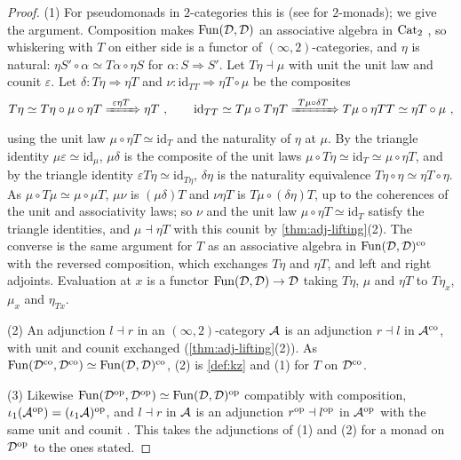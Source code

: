 \begin{proof}
%
(1) For pseudomonads in $2$-categories this is
\cite[Thm.~11.1]{marmolejo1997doctrines} (see
\cite[Thm.~6.2]{kellylack1997propertylike} for $2$-monads); we give the
argument. Composition makes $\operatorname{Fun}(\mathcal{D},\mathcal{D})$ an associative algebra in $\mathrm{Cat}_{2}$
\cite[\S 4.7.1]{ha}, so whiskering with $T$ on either side is a functor of
$(\infty,2)$-categories, and $\eta$ is natural:
$\eta S' \circ \alpha \simeq T\alpha \circ \eta S$
for
$\alpha\colon S \Rightarrow S'$.
Let
$T\eta \dashv \mu$
with unit the unit law and counit $\varepsilon$. Let
$\delta\colon T\eta \Rightarrow \eta T$
and
$\nu\colon \mathrm{id}_{TT} \Rightarrow \eta T \circ \mu$
be the composites
\begin{equation*}
T\eta \simeq T\eta \circ \mu \circ \eta T \xRightarrow{\ \varepsilon\eta T\ }
\eta T \ , \qquad \mathrm{id}_{TT} \simeq T\mu \circ T\eta T
\xRightarrow{\ T\mu \circ \delta T\ } T\mu \circ \eta TT \simeq \eta T \circ
\mu \ ,
\end{equation*}
using the unit law
$\mu \circ \eta T \simeq \mathrm{id}_{T}$
and the naturality of $\eta$ at $\mu$.
By the triangle identity
$\mu\varepsilon \simeq \mathrm{id}_{\mu}$,
$\mu\delta$ is the composite of the unit laws
$\mu \circ T\eta \simeq \mathrm{id}_{T} \simeq \mu \circ \eta T$,
and by the triangle identity
$\varepsilon T\eta \simeq \mathrm{id}_{T\eta}$,
$\delta\eta$ is the naturality equivalence
$T\eta \circ \eta \simeq \eta T \circ \eta$.
As
$\mu \circ T\mu \simeq \mu \circ \mu T$,
$\mu\nu$ is $(\mu\delta)T$ and
$\nu\eta T$ is
$T\mu \circ (\delta\eta)T$,
up to the coherences of the unit and associativity laws; so $\nu$ and the unit
law
$\mu \circ \eta T \simeq \mathrm{id}_{T}$
satisfy the triangle identities, and
$\mu \dashv \eta T$
with this counit by \cref{thm:adj-lifting}(2). The converse is the same
argument for $T$ as an associative algebra in
$\operatorname{Fun}(\mathcal{D},\mathcal{D})^{\mathrm{co}}$
with
the reversed composition, which exchanges $T\eta$ and $\eta T$, and left and
right adjoints.
Evaluation at $x$ is a functor
$\operatorname{Fun}(\mathcal{D},\mathcal{D}) \to \mathcal{D}$
taking $T\eta$, $\mu$ and $\eta T$ to $T\eta_{x}$, $\mu_{x}$ and $\eta_{Tx}$.

(2) An adjunction $l \dashv r$ in an $(\infty,2)$-category $\mathcal{A}$ is an adjunction
$r \dashv l$ in $\mathcal{A}^{\mathrm{co}}$, with unit and counit exchanged
(\cref{thm:adj-lifting}(2)). As
$\operatorname{Fun}(\mathcal{D}^{\mathrm{co}},\mathcal{D}^{\mathrm{co}}) \simeq \operatorname{Fun}(\mathcal{D},\mathcal{D})^{\mathrm{co}}$,
(2) is \cref{def:kz} and (1) for $T$ on $\mathcal{D}^{\mathrm{co}}$.

(3) Likewise
$\operatorname{Fun}(\mathcal{D}^{\mathrm{op}},\mathcal{D}^{\mathrm{op}}) \simeq \operatorname{Fun}(\mathcal{D},\mathcal{D})^{\mathrm{op}}$
compatibly with composition,
$\iota_{1}(\mathcal{A}^{\mathrm{op}}) = (\iota_{1}\mathcal{A})^{\mathrm{op}}$,
and
$l \dashv r$ in $\mathcal{A}$ is an adjunction
$r^{\mathrm{op}} \dashv l^{\mathrm{op}}$
in $\mathcal{A}^{\mathrm{op}}$ with the same unit and counit
\cite[Rem.~4.3]{haugseng2021laxmonads}.
This takes the adjunctions of (1) and (2) for a monad on $\mathcal{D}^{\mathrm{op}}$ to the
ones stated.


\end{proof}
